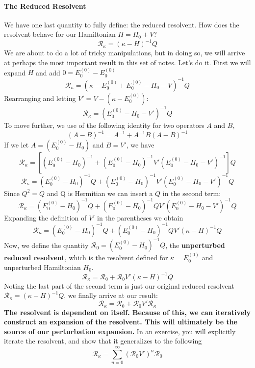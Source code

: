 \documentclass{article}
\newcommand{\Ezero}{E^{(0)}}
\newcommand{\Rz}{\mathcal{R}_{0}}
\begin{document}
\paragraph{\textbf{The Reduced Resolvent}}
We have one last quantity to fully define: the reduced resolvent. 
How does the resolvent behave for our Hamiltonian $H = H_0 + V$? 
\[\mathcal{R}_{\kappa} = (\kappa - H)^{-1}Q \]
We are about to do a lot of tricky manipulations, but in doing so,
we will arrive at perhaps the most important result in this set of notes. 
Let's do it.
First we will expand $H$ and add $0 = \Ezero_0 - \Ezero_0$
\[\mathcal{R}_{\kappa} = (\kappa - \Ezero_0 + \Ezero_0 - H_0 - V)^{-1}Q \]
Rearranging and letting $V' = V - (\kappa - \Ezero_0)$:
\[\mathcal{R}_{\kappa} = (\Ezero_0 - H_0 - V')^{-1}Q \]
To move further, we use of the following identity for two operators $A$ and $B$,
\[ (A- B)^{-1} = A^{-1} + A^{-1} B (A - B)^{-1} \]
If we let  $A = (\Ezero_0 - H_0)$ and $B = V'$, we have
\[\mathcal{R}_{\kappa} = \left[ (\Ezero_0 - H_0)^{-1} +  (\Ezero_0 - H_0)^{-1} V' (\Ezero_0 - H_0 - V')^{-1} \right] Q\]
\[\mathcal{R}_{\kappa} = (\Ezero_0 - H_0)^{-1}Q +  (\Ezero_0 - H_0)^{-1} V' (\Ezero_0 - H_0 - V')^{-1}Q\]
Since $Q^2 = Q$ and Q is Hermitian we can insert a $Q$ in the second term:
\[\mathcal{R}_{\kappa} = (\Ezero_0 - H_0)^{-1}Q +  (\Ezero_0 - H_0)^{-1}Q V' (\Ezero_0 - H_0 - V')^{-1}Q\]
Expanding the definition of $V'$ in the parentheses we obtain
\[\mathcal{R}_{\kappa} = (\Ezero_0 - H_0)^{-1}Q +  (\Ezero_0 - H_0)^{-1}Q V' (\kappa - H)^{-1}Q\]
Now, we define the quantity $\Rz =  (\Ezero_0 - H_0)^{-1} Q$, the \textbf{unperturbed reduced resolvent}, 
which is the resolvent defined for $\kappa = \Ezero_0 $ and unperturbed Hamiltonian $H_0$.
\[\mathcal{R}_{\kappa} = \Rz +  \Rz V' (\kappa - H)^{-1}Q\]
Noting the last part of the second term is just our original reduced resolvent $\mathcal{R}_{\kappa} = (\kappa - H)^{-1}Q $,
we finally arrive at our result:
\[\mathcal{R}_{\kappa} = \Rz +  \Rz V' \mathcal{R}_{\kappa} \]
\textbf{The resolvent is dependent on itself. 
Because of this, we can iteratively construct an expansion of the resolvent. 
This will ultimately be the source of our perturbation expansion.}
In an exercise, you will explicitly iterate the resolvent, and show that it generalizes to the following
\[\mathcal{R}_{\kappa} = \sum_{n=0}^{\infty} (\Rz V')^n \Rz \]
\end{document}
